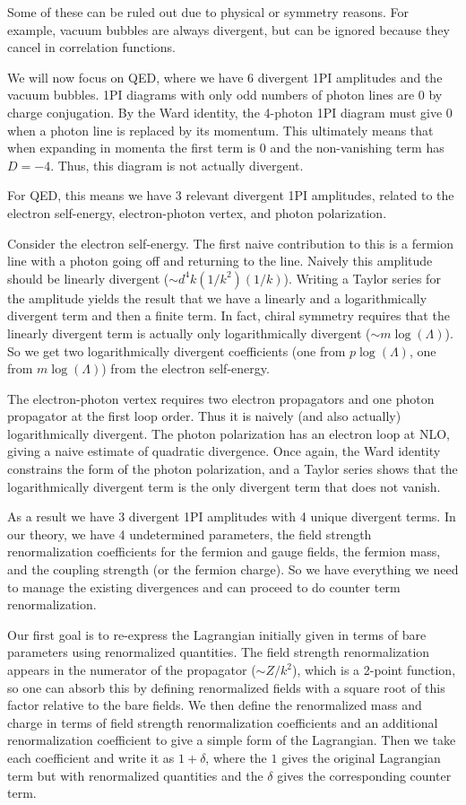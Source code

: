 \documentclass[12pt]{memoir}
\begin{document}
Some of these can be ruled out due to physical or symmetry reasons.
For example, vacuum bubbles are always divergent, but can be ignored because they cancel in correlation functions.

We will now focus on QED, where we have 6 divergent 1PI amplitudes and the vacuum bubbles.
1PI diagrams with only odd numbers of photon lines are 0 by charge conjugation.
By the Ward identity, the 4-photon 1PI diagram must give 0 when a photon line is replaced by its momentum.
This ultimately means that when expanding in momenta the first term is 0 and the non-vanishing term has $D=-4$.
Thus, this diagram is not actually divergent.

For QED, this means we have 3 relevant divergent 1PI amplitudes,
related to the electron self-energy, electron-photon vertex, and photon polarization.

Consider the electron self-energy.
The first naive contribution to this is a fermion line with a photon going off and returning to the line.
Naively this amplitude should be linearly divergent ($\sim d^4k (1/k^2) (1/k)$).
Writing a Taylor series for the amplitude yields the result that
we have a linearly and a logarithmically divergent term and then a finite term.
In fact, chiral symmetry requires that the linearly divergent term is actually only logarithmically divergent
($\sim m \log(\Lambda)$).
So we get two logarithmically divergent coefficients (one from $p \log(\Lambda)$, one from $m \log(\Lambda)$)
from the electron self-energy.

The electron-photon vertex requires two electron propagators and one photon propagator at the first loop order.
Thus it is naively (and also actually) logarithmically divergent.
The photon polarization has an electron loop at NLO, giving a naive estimate of quadratic divergence.
Once again, the Ward identity constrains the form of the photon polarization,
and a Taylor series shows that the logarithmically divergent term is the only divergent term that does not vanish.

As a result we have 3 divergent 1PI amplitudes with 4 unique divergent terms.
In our theory, we have 4 undetermined parameters,
the field strength renormalization coefficients for the fermion and gauge fields,
the fermion mass,
and the coupling strength (or the fermion charge).
So we have everything we need to manage the existing divergences and can proceed to do counter term renormalization.

Our first goal is to re-express the Lagrangian initially given in terms of bare parameters
using renormalized quantities.
The field strength renormalization appears in the numerator of the propagator ($\sim Z/k^2$),
which is a 2-point function,
so one can absorb this by defining renormalized fields with a square root of this factor
relative to the bare fields.
We then define the renormalized mass and charge in terms of field strength renormalization coefficients
and an additional renormalization coefficient to give a simple form of the Lagrangian.
Then we take each coefficient and write it as $1 + \delta$,
where the $1$ gives the original Lagrangian term but with renormalized quantities
and the $\delta$ gives the corresponding counter term.
\end{document}
